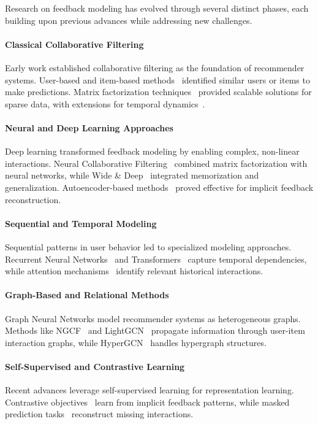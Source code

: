 Research on feedback modeling has evolved through several distinct phases, each building upon previous advances while addressing new challenges.

\paragraph{Classical Collaborative Filtering}
Early work established collaborative filtering as the foundation of recommender systems. User-based and item-based methods~\cite{sarwar2001item, breese1998empirical} identified similar users or items to make predictions. Matrix factorization techniques~\cite{koren2009matrix} provided scalable solutions for sparse data, with extensions for temporal dynamics~\cite{koren2010collaborative}.

\paragraph{Neural and Deep Learning Approaches}
Deep learning transformed feedback modeling by enabling complex, non-linear interactions. Neural Collaborative Filtering~\cite{he2017neural} combined matrix factorization with neural networks, while Wide \& Deep~\cite{cheng2016wide} integrated memorization and generalization. Autoencoder-based methods~\cite{sedhain2015autorec} proved effective for implicit feedback reconstruction.

\paragraph{Sequential and Temporal Modeling}
Sequential patterns in user behavior led to specialized modeling approaches. Recurrent Neural Networks~\cite{hidasi2015session} and Transformers~\cite{kang2018self, sun2019bert4rec} capture temporal dependencies, while attention mechanisms~\cite{kang2018self} identify relevant historical interactions.

\paragraph{Graph-Based and Relational Methods}
Graph Neural Networks model recommender systems as heterogeneous graphs. Methods like NGCF~\cite{wang2019neural} and LightGCN~\cite{he2020lightgcn} propagate information through user-item interaction graphs, while HyperGCN~\cite{hypergcn} handles hypergraph structures.

\paragraph{Self-Supervised and Contrastive Learning}
Recent advances leverage self-supervised learning for representation learning. Contrastive objectives~\cite{yao2021self, xie2022contrastive} learn from implicit feedback patterns, while masked prediction tasks~\cite{hou2022towards} reconstruct missing interactions.

